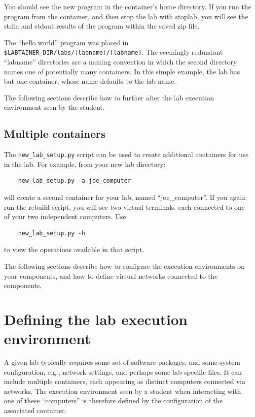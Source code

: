 \documentclass[12pt]{article}
\begin{document}
You should see the new program in the container's
home directory.  If you run the program from the container, and then stop the lab
with stoplab, you will see the stdin and stdout results of the program within the
saved zip file.

The ``hello world'' program was placed in \verb!$LABTAINER_DIR/labs/[labname]/[labname]!.
The seemingly redundant ``labname'' directories are a naming convention in which the
second directory names one of potentially many containers.  In this simple example,
the lab has but one container, whose name defaults to the lab name.

The following sections describe how to further alter the lab execution environment seen by 
the student.

\subsection {Multiple containers}
The {\tt new\_lab\_setup.py} script can be used to create additional containers for use
in the lab.  For example, from your new lab directory:
\begin{verbatim}
    new_lab_setup.py -a joe_computer
\end{verbatim}
\noindent will create a second container for your lab,
named ``joe\_computer''.  If you again run the rebuild script, you will see two virtual
terminals, each connected to one of your two independent computers.  Use 
\begin{verbatim}
    new_lab_setup.py -h
\end{verbatim}
\noindent to view the operations available in that script.

The following sections describe how to configure the execution environments on your components,
and how to define virtual networks connected to the components.

\section {Defining the lab execution environment}
\label{execution environment}
A given lab typically requires some set of software packages, and some
system configuration, e.g., network settings, and perhaps some lab-specific
files.  It can include multiple containers, each appearing as distinct
computers connected via networks.  The execution environment seen by a
student when interacting with one of these ``computers'' is therefore defined
by the configuration of the associated container. 
\end{document}
